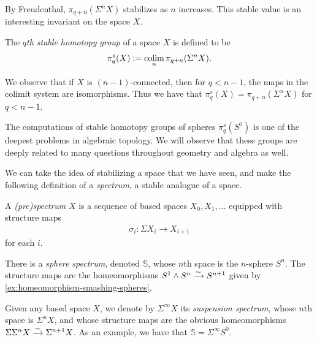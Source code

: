 \documentclass{article}[11pt]
\newcommand{\smashprod}{\wedge} %
\begin{document}
By Freudenthal, $\pi_{q+n}(\Sigma^n X)$ stabilizes as $n$ increases. This stable value is an interesting invariant on the space $X$.

\begin{definition}\label{def:stable-homotopy-group} The \textit{$q$th stable homotopy group} of a space $X$ is defined to be
\begin{align*}
	\pi_q^s (X) := \mathop{\operatorname*{colim}}_n \pi_{q+n}(\Sigma^n X).
\end{align*}
\end{definition}

We observe that if $X$ is $(n-1)$-connected, then for $q < n-1$, the maps in the colimit system are isomorphisms. Thus we have that $\pi_q^s(X) = \pi_{q+n}(\Sigma^n X)$ for $q < n-1$.

\begin{remark} The computations of stable homotopy groups of spheres $\pi_q^s (S^0)$ is one of the deepest problems in algebraic topology. We will observe that these groups are deeply related to many questions throughout geometry and algebra as well.
\end{remark}

We can take the idea of stabilizing a space that we have seen, and make the following definition of a \emph{spectrum}, a stable  analogue of a space.





\begin{definition} A \textit{(pre)spectrum} $X$ is a sequence of based spaces $X_0, X_1, \ldots$ equipped with structure maps
\begin{align*}
	\sigma_i : \Sigma X_i \to X_{i+1}
\end{align*}
for each $i$.
\end{definition}


\begin{example}\label{ex:sphere-spectrum} There is a \textit{sphere spectrum}, denoted $\mathbb{S}$, whose $n$th space is the $n$-sphere $S^n$. The structure maps are the homeomorphisms $S^1 \smashprod S^n \xto{\sim} S^{n+1}$ given by \autoref{ex:homeomorphism-smashing-spheres}.
\end{example}



\begin{example}\label{ex:suspension-spectrum} Given any based space $X$, we denote by $\Sigma^\infty X$ its \textit{suspension spectrum}, whose $n$th space is $\Sigma^n X$, and whose structure maps are the obvious homeomorphisms $\Sigma \Sigma^n X \xrightarrow{\sim} \Sigma^{n+1} X$. As an example, we have that $\mathbb{S} = \Sigma^\infty S^0$.
\end{example}
\end{document}
